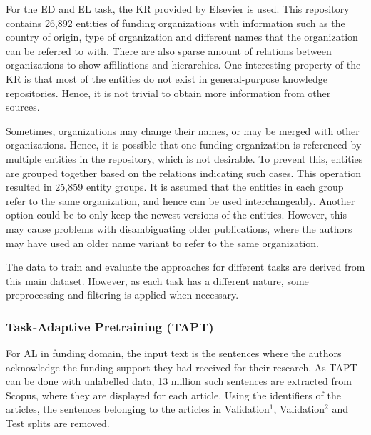 \documentclass{report}
\theoremstyle{definition}
\theoremstyle{remark}
\begin{document}
For the ED and EL task, the KR provided by Elsevier is used. This repository contains 26,892 entities of funding organizations with information such as the country of origin, type of organization and different names that the organization can be referred to with. There are also sparse amount of relations between organizations to show affiliations and hierarchies. One interesting property of the KR is that most of the entities do not exist in general-purpose knowledge repositories. Hence, it is not trivial to obtain more information from other sources.

Sometimes, organizations may change their names, or may be merged with other organizations. Hence, it is possible that one funding organization is referenced by multiple entities in the repository, which is not desirable. To prevent this, entities are grouped together based on the relations indicating such cases. This operation resulted in 25,859 entity groups. It is assumed that the entities in each group refer to the same organization, and hence can be used interchangeably. Another option could be to only keep the newest versions of the entities. However, this may cause problems with disambiguating older publications, where the authors may have used an older name variant to refer to the same organization.

The data to train and evaluate the approaches for different tasks are derived from this main dataset. However, as each task has a different nature, some preprocessing and filtering is applied when necessary. 
\subsubsection{Task-Adaptive Pretraining (TAPT)}
For AL in funding domain, the input text is the sentences where the authors acknowledge the funding support they had received for their research. As TAPT can be done with unlabelled data, 13 million such sentences are extracted from Scopus, where they are displayed for each article. Using the identifiers of the articles, the sentences belonging to the articles in Validation$^1$, Validation$^2$ and Test splits are removed.
\end{document}
